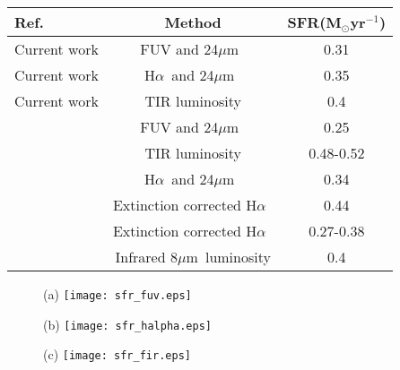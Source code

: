 \documentclass[useAMS,usenatbib]{mn2e}
\newcommand \halpha    {H$\alpha $\ }
\newcommand \um    {$\mu$m\ }
\begin{document}
\begin{table*}
\begin{minipage}{100mm}
\caption{Comparison of Total Star Formation Rate of M31}
\label{table:sfr}
\begin{tabular}{@{}lcc}
\hline\hline
Ref.&Method&SFR(M$_{\odot}$yr$^{-1}$) \\
\hline
Current work&FUV and 24\um&0.31\\
Current work&\halpha and 24\um&0.35\\
Current work&TIR luminosity&0.4\\
\cite{Ford13}&FUV and 24\um&0.25\\
\cite{Ford13}&TIR luminosity&0.48-0.52\\
\cite{Azimlu11}& \halpha and 24\um&0.34\\
\cite{Azimlu11}&Extinction corrected \halpha&0.44\\
\cite{Tabatabaei10}&Extinction corrected \halpha&0.27-0.38\\
\cite{Barmby06}&Infrared 8\um luminosity& 0.4\\
\hline
\end{tabular}
\end{minipage}
\end{table*}


\begin{figure*}
        \centering
        \begin{subfigure}\\(a){}
                \texttt{[image: sfr\_fuv.eps]}

               \label{fig:sfr_halpha}
        \end{subfigure}
        \begin{subfigure}\\(b){}
                \texttt{[image: sfr\_halpha.eps]}

               \label{fig:sfr_halpha}
        \end{subfigure}
        \begin{subfigure}\\(c){}
                \texttt{[image: sfr\_fir.eps]}

                \label{fig:sfr_fir_small}
        \end{subfigure}
         \quad
               \caption{SFR map from a combination of FUV + 24\um emission (top), \halpha and 24\um emission (middle), and total infrared emission (bottom)}
\label{fig:sfrs}
\end{figure*}
\end{document}
